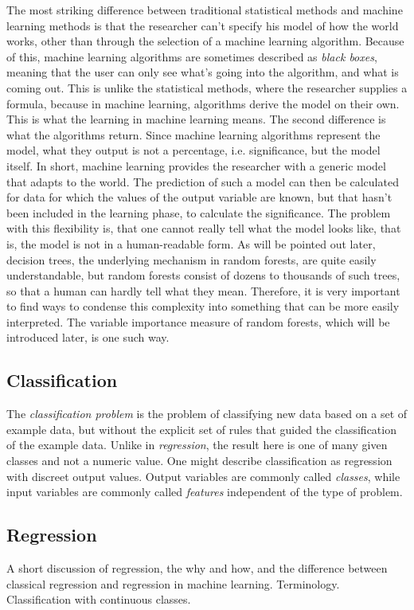 \documentclass[a4paper,man,12pt,apacite,floatsintext,draftfirst]{apa6} %
\begin{document}
The most striking difference between traditional statistical methods and
machine learning methods is that the researcher can't specify his model of
how the world works, other than through the selection of a machine learning
algorithm.
Because of this, machine learning algorithms are sometimes described as
\emph{black boxes}, meaning that the user can only see what's going into the
algorithm, and what is coming out.
This is unlike the statistical methods, where the researcher supplies a
formula, because in machine learning, algorithms derive the model on their own.
This is what the learning in machine learning means.
The second difference is what the algorithms return.
Since machine learning algorithms represent the model, what they output is
not a percentage, i.e. significance, but the model itself.
In short, machine learning provides the researcher with a generic model
that adapts to the world.
The prediction of such a model can then be calculated for data for which
the values of the output variable are known, but that hasn't
been included in the learning phase, to calculate the significance.
The problem with this flexibility is, that one cannot really tell what the
model looks like, that is, the model is not in a human-readable form.
As will be pointed out later, decision trees, the underlying mechanism in
random forests, are quite easily understandable, but random forests
consist of dozens to thousands of such trees, so that a human can hardly
tell what they mean.
Therefore, it is very important to find ways to condense this complexity
into something that can be more easily interpreted.
The variable importance measure of random forests, which will be introduced
later, is one such way.

\subsection{Classification}
The \emph{classification problem} is the problem of classifying new data based
on a set of example data, but without the explicit set of rules that guided the
classification of the example data.
Unlike in \emph{regression}, the result here is one of many given classes
and not a numeric value.
One might describe classification as regression with discreet output values.
Output variables are commonly called \emph{classes}, while input variables
are commonly called \emph{features} independent of the type of problem.

\subsection{Regression}
A short discussion of regression, the why and how, and the difference
between classical regression and regression in machine learning.
Terminology. Classification with continuous classes.
\end{document}
